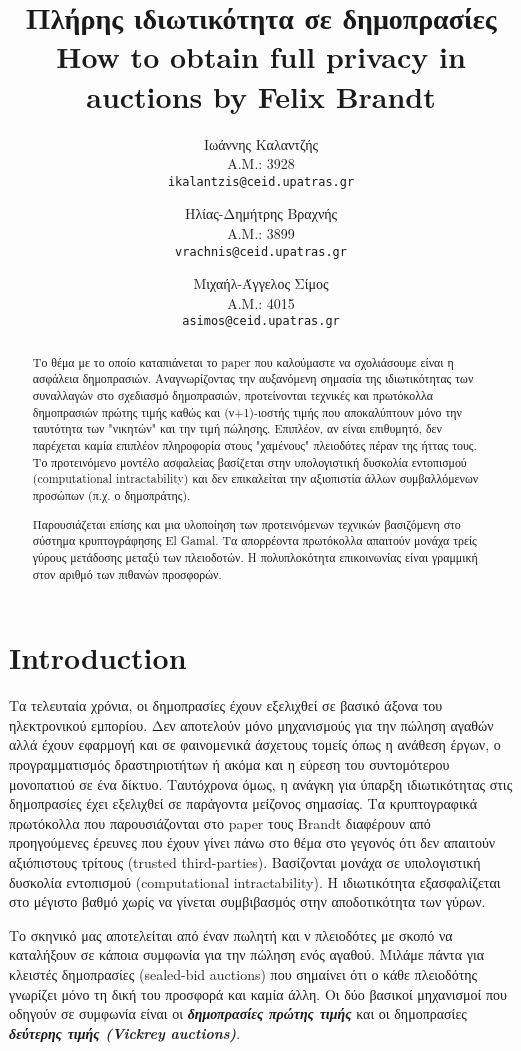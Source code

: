 \documentclass[a4paper,11pt]{article}
\title{
	Πλήρης ιδιωτικότητα σε δημοπρασίες \\
	\vspace{3mm}
	\normalsize{\textbf{How to obtain full privacy in auctions} by \textbf{Felix Brandt}} \\
}
\author{
	Ιωάννης Καλαντζής\\
	Α.Μ.: 3928\\
	\texttt{ikalantzis@ceid.upatras.gr}
\and
	Ηλίας-Δημήτρης Βραχνής\\
	Α.Μ.: 3899\\
	\texttt{vrachnis@ceid.upatras.gr}
\and
	Μιχαήλ-Άγγελος Σίμος\\
	Α.Μ.: 4015\\
	\texttt{asimos@ceid.upatras.gr}
}
\date{}
\begin{document}
\maketitle

\begin{abstract} Το θέμα με το οποίο καταπιάνεται το paper που καλούμαστε να σχολιάσουμε είναι η ασφάλεια
δημοπρασιών. Αναγνωρίζοντας την αυξανόμενη σημασία της ιδιωτικότητας των συναλλαγών στο σχεδιασμό δημοπρασιών,
προτείνονται τεχνικές και πρωτόκολλα δημοπρασιών πρώτης τιμής καθώς και (ν+1)-ιοστής τιμής που αποκαλύπτουν
μόνο την ταυτότητα των "νικητών" και την τιμή πώλησης. Επιπλέον, αν είναι επιθυμητό, δεν παρέχεται καμία
επιπλέον πληροφορία στους "χαμένους" πλειοδότες πέραν της ήττας τους. Το προτεινόμενο μοντέλο ασφαλείας
βασίζεται στην υπολογιστική δυσκολία εντοπισμού (computational intractability) και δεν επικαλείται την
αξιοπιστία άλλων συμβαλλόμενων προσώπων (π.χ. ο δημοπράτης).

Παρουσιάζεται επίσης και μια υλοποίηση των προτεινόμενων τεχνικών βασιζόμενη στο σύστημα κρυπτογράφησης El
Gamal. Τα απορρέοντα πρωτόκολλα απαιτούν μονάχα τρείς γύρους μετάδοσης μεταξύ των πλειοδοτών. Η πολυπλοκότητα
επικοινωνίας είναι γραμμική στον αριθμό των πιθανών προσφορών. \end{abstract}

\section{Introduction} Τα τελευταία χρόνια, οι δημοπρασίες έχουν εξελιχθεί σε βασικό άξονα του ηλεκτρονικού
εμπορίου. Δεν αποτελούν μόνο μηχανισμούς για την πώληση αγαθών αλλά έχουν εφαρμογή και σε φαινομενικά άσχετους
τομείς όπως η ανάθεση έργων, ο προγραμματισμός δραστηριοτήτων ή ακόμα και η εύρεση του συντομότερου μονοπατιού
σε ένα δίκτυο. Ταυτόχρονα όμως, η ανάγκη για ύπαρξη ιδιωτικότητας στις δημοπρασίες έχει εξελιχθεί σε παράγοντα
μείζονος σημασίας. Τα κρυπτογραφικά πρωτόκολλα που παρουσιάζονται στο paper τους Brandt διαφέρουν από
προηγούμενες έρευνες που έχουν γίνει πάνω στο θέμα στο γεγονός ότι δεν απαιτούν αξιόπιστους τρίτους (trusted
third-parties). Βασίζονται μονάχα σε υπολογιστική δυσκολία εντοπισμού (computational intractability). Η
ιδιωτικότητα εξασφαλίζεται στο μέγιστο βαθμό χωρίς να γίνεται συμβιβασμός στην αποδοτικότητα των γύρων.

Το σκηνικό μας αποτελείται από έναν πωλητή και ν πλειοδότες με σκοπό να καταλήξουν σε κάποια συμφωνία για την
πώληση ενός αγαθού. Μιλάμε πάντα για κλειστές δημοπρασίες (sealed-bid auctions) που σημαίνει ότι ο κάθε
πλειοδότης γνωρίζει μόνο τη δική του προσφορά και καμία άλλη. Οι δύο βασικοί μηχανισμοί που οδηγούν σε
συμφωνία είναι οι \textbf{\emph{δημοπρασίες πρώτης τιμής}} και οι δημοπρασίες \textbf{\emph{δεύτερης τιμής
(Vickrey auctions)}}.
\end{document}
